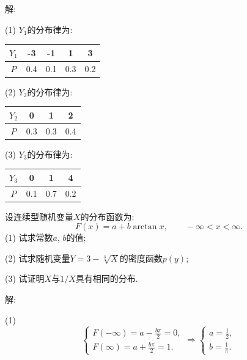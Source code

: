 \documentclass[standard]{ExBook}
\renewenvironment{shaded}{%
  \def\FrameCommand{\fboxsep=\FrameSep \colorbox{shadecolor}}%
  \MakeFramed{\advance\hsize-\width \FrameRestore}%
}{%
  \endMakeFramed
}
\begin{document}
\begin{qitems}
解: 

(1) $Y_1$的分布律为:
\begin{center}
\setlength{\tabcolsep}{14pt}
\begin{tabular}{c|cccc}
$Y_1$ & -3 & -1 & 1 & 3\\
\hline
$P$ & 0.4 & 0.1 & 0.3 & 0.2\\
\end{tabular}
\end{center}

(2) $Y_2$的分布律为:
\begin{center}
\setlength{\tabcolsep}{14pt}
\begin{tabular}{c|ccc}
$Y_2$ & 0 & 1 & 2\\
\hline
$P$ & 0.3 & 0.3 & 0.4\\
\end{tabular}
\end{center}

(3) $Y_3$的分布律为:
\begin{center}
\setlength{\tabcolsep}{14pt}
\begin{tabular}{c|ccc}
$Y_3$ & 0 & 1 & 4\\
\hline
$P$ & 0.1 & 0.7 & 0.2\\
\end{tabular}
\end{center}

\vspace{2.5cm-5em}

    \begin{bbox}
    \begin{shaded}
        \qitem
设连续型随机变量$X$的分布函数为:
$$F(x)=a+b\arctan x,\qquad -\infty < x < \infty.$$
(1) 试求常数$a$, $b$的值;

(2) 试求随机变量$Y=3-\sqrt[3]{X}$的密度函数$p(y)$;

(3) 试证明$X$与$1/X$具有相同的分布.
    \end{shaded}
    \end{bbox}

\vspace{\dimexpr2.5cm-5em\relax}

解: 

(1)
$$
    \left\{
    \begin{array}{l}
        F(-\infty)=a-\displaystyle\frac{b\pi}{2}=0,\\
        F(\infty)=a+\displaystyle\frac{b\pi}{2}=1.
    \end{array}
    \right.
    \Longrightarrow
    \left\{
    \begin{array}{l}
        a=\displaystyle\frac{1}{2},\\
        b=\displaystyle\frac{1}{\pi}.
    \end{array}
    \right.
$$


\end{qitems}
\end{document}
